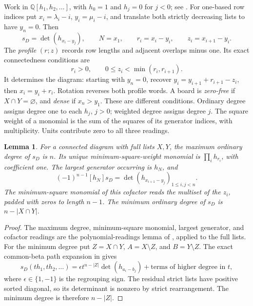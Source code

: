 \documentclass[11pt,a4paper]{amsart}
\numberwithin{equation}{section}
\theoremstyle{plain}
\newtheorem{lemma}[theorem]{Lemma}
\theoremstyle{definition}
\newcommand{\Q}{\mathbb Q}
\begin{document}
Work in \(\Q[h_1,h_2,\ldots]\), with \(h_0=1\) and \(h_j=0\) for
\(j<0\); see \cite{Macdonald1995SymmetricFunctions}.  For one-based row
indices put \(x_i=\lambda_i-i\), \(y_i=\mu_i-i\), and translate both
strictly decreasing lists to have \(y_n=0\).  Then
\[
 s_D=\det(h_{x_i-y_j}),\qquad N=x_1,
 \qquad r_i=x_i-y_i,
 \qquad z_i=x_{i+1}-y_i.
\]
The \emph{profile} \((r;z)\) records row lengths and adjacent overlaps minus
one.  Its exact connectedness conditions are
\begin{equation}\label{eq:profile-domain}
 r_i>0,\qquad 0\le z_i<\min(r_i,r_{i+1}).
\end{equation}
It determines the diagram: starting with \(y_n=0\), recover
\(y_i=y_{i+1}+r_{i+1}-z_i\), then \(x_i=y_i+r_i\).
Rotation reverses both profile words.  A board is \emph{zero-free} if
\(X\cap Y=\varnothing\), and \emph{dense} if \(x_n>y_1\).
These are different conditions.  Ordinary degree assigns degree one to
each \(h_j\), \(j>0\); weighted degree assigns degree \(j\).
The square weight of a monomial is the sum of the squares of its generator
indices, with multiplicity.  Units contribute zero to all three readings.

\begin{lemma}\label{lem:readings}
For a connected diagram with full lists \(X,Y\), the maximum ordinary
degree of \(s_D\) is \(n\).  Its unique minimum-square-weight monomial is \(\prod_i h_{r_i}\),
with coefficient one.  The largest generator occurring is \(h_N\), and
\begin{equation}\label{eq:maximal-cofactor}
 (-1)^{n-1}[h_N]s_D
 =\det(h_{x_{i+1}-y_j})_{1\le i,j<n}.
\end{equation}
The minimum-square monomial of this cofactor reads the multiset of the
\(z_i\), padded with zeros to length \(n-1\).  The minimum ordinary degree
of \(s_D\) is \(n-|X\cap Y|\).
\end{lemma}

\begin{proof}
The maximum degree, minimum-square monomial, largest generator, and
cofactor readings are the polynomial-readings lemma of
\cite{Shields2026Cofactor}, applied to the full lists.  For the minimum
degree put \(Z=X\cap Y\), \(A=X\setminus Z\), and
\(B=Y\setminus Z\).  The exact common-beta path expansion in
\cite{Shields2026Cofactor} gives
\[
 s_D(th_1,th_2,\ldots)
 =\epsilon t^{n-|Z|}\det(h_{a_i-b_j})
   +\text{terms of higher degree in }t,
\]
where \(\epsilon\in\{1,-1\}\) is the regrouping sign.  The residual
strict lists have positive sorted diagonal, so its determinant is
nonzero by strict rearrangement.  The minimum degree is therefore
\(n-|Z|\).
\end{proof}
\end{document}
